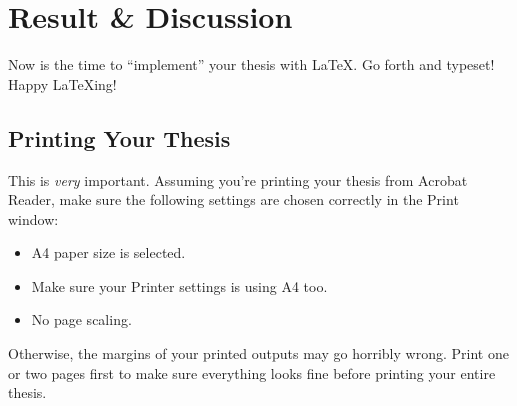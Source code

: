 \chapter{Result \& Discussion}\label{chap:implementation}

Now is the time to ``implement'' your thesis with \LaTeX.  Go forth and typeset! Happy \LaTeX{}ing! %

\section{Printing Your Thesis}
This is \emph{very} important. Assuming you're printing your thesis from Acrobat Reader, make sure the following settings are chosen correctly in the Print window:

\begin{itemize}[nosep]
\item A4 paper size is selected.
\item Make sure your Printer settings is using A4 too.
\item No page scaling.
\end{itemize}

Otherwise, the margins of your printed outputs may go horribly wrong. Print one or two pages first to make sure everything looks fine before printing your entire thesis.